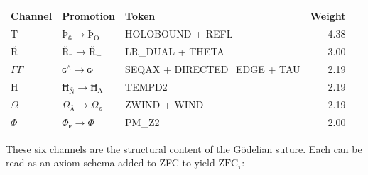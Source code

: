 \documentclass[12pt,twoside]{book}
\theoremstyle{definition}
\newcommand{\ZFCt}{\text{ZFC}_{\tau}}
\newcommand{\prim}[1]{\text{#1}}
\begin{document}
\begin{center}
\begin{tabular}{lllr}
\toprule
\textbf{Channel} & \textbf{Promotion} & \textbf{Token} & \textbf{Weight} \\
\midrule
$\prim{T}$ & $\text{Þ}_{\text{6}} \to \text{Þ}_{\text{O}}$ & HOLOBOUND + REFL & 4.38 \\
$\text{Ř}$ & $\text{Ř}_{\text{¯}} \to \text{Ř}_{\text{=}}$ & LR\_DUAL + THETA & 3.00 \\
$\Gamma \!\!\! \Gamma$ & $\text{ɢ}^{\land} \to \text{ɢ}^{\text{ˌ}}$ & SEQAX + DIRECTED\_EDGE + TAU & 2.19 \\
$\prim{H}$ & $\text{Ħ}_{\text{Ñ}} \to \text{Ħ}_{\text{A}}$ & TEMPD2 & 2.19 \\
$\Omega$ & $\Omega_{\text{Å}} \to \Omega_{\text{z}}$ & ZWIND + WIND & 2.19 \\
$\Phi$ & $\Phi_{\text{ɐ}} \to \Phi_{\text{}}$ & PM\_Z2 & 2.00 \\
\bottomrule
\end{tabular}
\end{center}

These six channels are the structural content of the G\"odelian suture. Each can be read as an axiom schema added to ZFC to yield $\ZFCt$:
\end{document}

